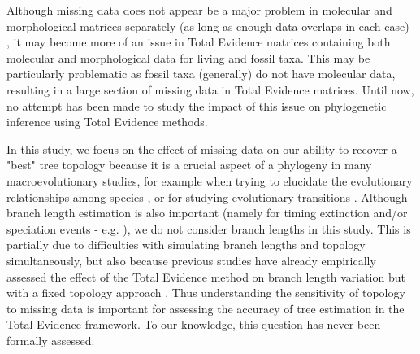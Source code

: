 \documentclass[12pt,letterpaper]{article}
\begin{document}
Although missing data does not appear be a major problem in molecular and morphological matrices separately (as long as enough data overlaps in each case)
 \citep{wiensmissing2003,wiensmissing2006,wiensmissing2008,rouresite-specific2011,pattinsonphylogeny2014}, it may become more of an issue in Total Evidence matrices containing both molecular and morphological data for living and fossil taxa. This may be particularly problematic as fossil taxa (generally) do not have molecular data, resulting in a large section of missing data in Total Evidence matrices. Until now, no attempt has been made to study the impact of this issue on phylogenetic inference using Total Evidence methods.

In this study, we focus on the effect of missing data on our ability to recover a "best" tree topology because it is a crucial aspect of a phylogeny in many macroevolutionary studies, for example when trying to elucidate the evolutionary relationships among species \citep[e.g.][]{meredithimpacts2011,jetzthe2012}, or for studying evolutionary transitions \citep[e.g.][]{friedmanexplosive2010}. Although branch length estimation is also important (namely for timing extinction and/or speciation events - e.g. \citealt{ronquista2012}), we do not consider branch lengths in this study. This is partially due to difficulties with simulating branch lengths and topology simultaneously, but also because previous studies have already empirically assessed the effect of the Total Evidence method on branch length variation but with a fixed topology approach \citep{ronquista2012,schragocombining2013,slaterphylogenetic2013,beckancient2014}. Thus understanding the sensitivity of topology to missing data is important for assessing the accuracy of tree estimation in the Total Evidence framework. To our knowledge, this question has never been formally assessed.
\end{document}
